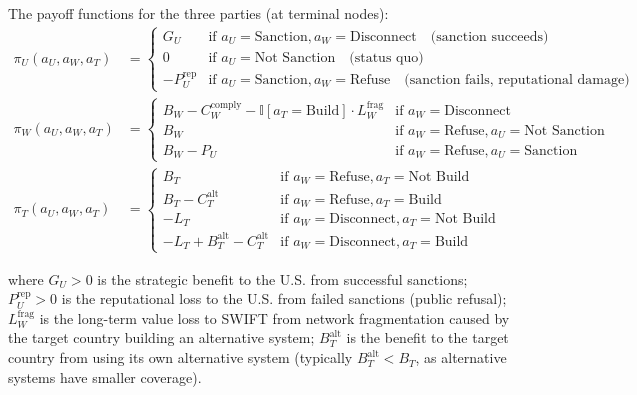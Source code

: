 \documentclass[12pt,a4paper]{article}
\theoremstyle{definition}
\theoremstyle{remark}
\begin{document}
The payoff functions for the three parties (at terminal nodes):
\begin{align}
\pi_U(a_U, a_W, a_T) &=
\begin{cases}
G_U & \text{if } a_U = \text{Sanction}, a_W = \text{Disconnect} \quad \text{(sanction succeeds)}\\
0 & \text{if } a_U = \text{Not Sanction} \quad \text{(status quo)}\\
-P_U^{\text{rep}} & \text{if } a_U = \text{Sanction}, a_W = \text{Refuse} \quad \text{(sanction fails, reputational damage)}
\end{cases}\\[6pt]
\pi_W(a_U, a_W, a_T) &=
\begin{cases}
B_W - C_W^{\text{comply}} - \mathbb{I}[a_T = \text{Build}] \cdot L_W^{\text{frag}} & \text{if } a_W = \text{Disconnect}\\
B_W & \text{if } a_W = \text{Refuse}, a_U = \text{Not Sanction}\\
B_W - P_U & \text{if } a_W = \text{Refuse}, a_U = \text{Sanction}
\end{cases}\\[6pt]
\pi_T(a_U, a_W, a_T) &=
\begin{cases}
B_T & \text{if } a_W = \text{Refuse}, a_T = \text{Not Build}\\
B_T - C_T^{\text{alt}} & \text{if } a_W = \text{Refuse}, a_T = \text{Build}\\
-L_T & \text{if } a_W = \text{Disconnect}, a_T = \text{Not Build}\\
-L_T + B_T^{\text{alt}} - C_T^{\text{alt}} & \text{if } a_W = \text{Disconnect}, a_T = \text{Build}
\end{cases}
\end{align}

where $G_U > 0$ is the strategic benefit to the U.S. from successful sanctions; $P_U^{\text{rep}} > 0$ is the reputational loss to the U.S. from failed sanctions (public refusal); $L_W^{\text{frag}}$ is the long-term value loss to SWIFT from network fragmentation caused by the target country building an alternative system; $B_T^{\text{alt}}$ is the benefit to the target country from using its own alternative system (typically $B_T^{\text{alt}} < B_T$, as alternative systems have smaller coverage).
\end{document}
